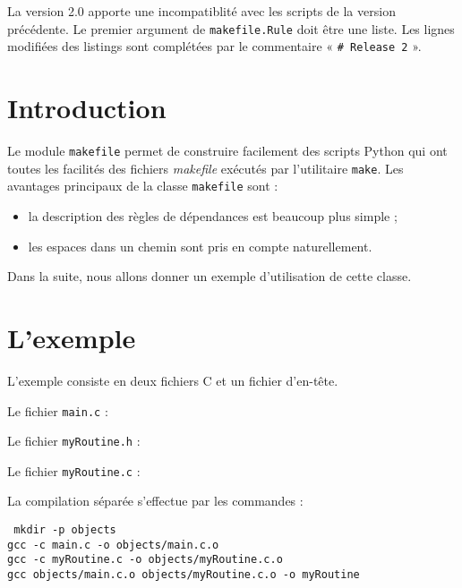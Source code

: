 \documentclass[a4paper,11pt]{extarticle}
\begin{document}
La version 2.0 apporte une incompatiblité avec les scripts de la version précédente. Le premier argument de \texttt{makefile.Rule} doit être une liste. Les lignes modifiées des listings sont complétées par le commentaire « \texttt{\# Release 2} ».


\section{Introduction}

Le module \texttt{makefile} permet de construire facilement des scripts Python qui ont toutes les facilités des fichiers \emph{makefile} exécutés par l'utilitaire \texttt{make}. Les avantages principaux de la classe \texttt{makefile} sont :
\begin{itemize}
  \item la description des règles de dépendances est beaucoup plus simple ;
  \item les espaces dans un chemin sont pris en compte naturellement. 
\end{itemize}

Dans la suite, nous allons donner un exemple d'utilisation de cette classe.

\section{L'exemple}

L'exemple consiste en deux fichiers C et un fichier d'en-tête.

Le fichier \texttt{main.c} :



Le fichier \texttt{myRoutine.h} :



Le fichier \texttt{myRoutine.c} :


La compilation séparée s'effectue par les commandes :

\begin{mdframed}[hidealllines=true,backgroundcolor=lightgray!20]
\tt\footnotesize
mkdir -p objects\\
gcc -c main.c -o objects/main.c.o\\
gcc -c myRoutine.c -o objects/myRoutine.c.o\\
gcc objects/main.c.o objects/myRoutine.c.o -o myRoutine
\end{mdframed}
\end{document}
